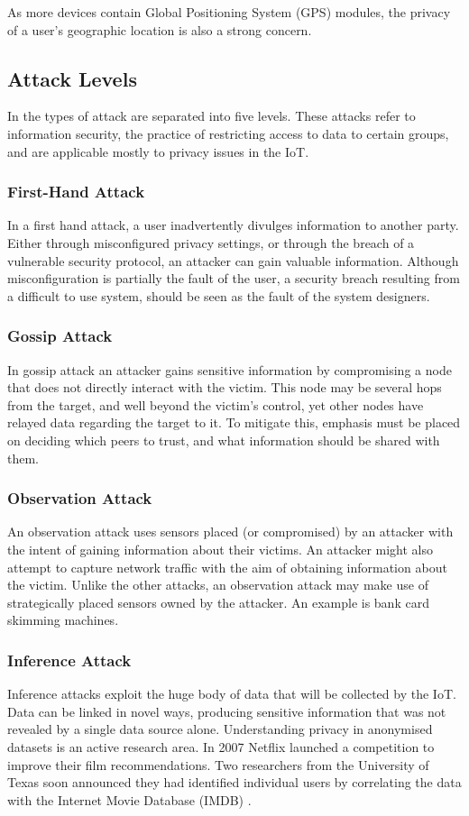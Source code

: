 \documentclass[10pt,journal,compsoc]{IEEEtran}
\begin{document}
As more devices contain Global Positioning System (GPS) modules, the privacy of
a user's geographic location is also a strong concern.

\subsection{Attack Levels}
In \cite{Elkhodr2013} the types of attack are separated into five levels. These
attacks refer to information security, the practice of restricting access to
data to certain groups, and are applicable mostly to privacy issues in the IoT.

\subsubsection{First-Hand Attack}
In a first hand attack, a user inadvertently divulges information to another
party. Either through misconfigured privacy settings, or through the breach of
a vulnerable security protocol, an attacker can gain valuable information.
Although misconfiguration is partially the fault of the user, a security breach
resulting from a difficult to use system, should be seen as the fault of the
system designers. 

\subsubsection{Gossip Attack}
In gossip attack an attacker gains sensitive information by compromising a node
that does not directly interact with the victim. This node may be several hops
from the target, and well beyond the victim's control, yet other nodes have
relayed data regarding the target to it. To mitigate this, emphasis must be
placed on deciding which peers to trust, and what information should be shared
with them.

\subsubsection{Observation Attack}
An observation attack uses sensors placed (or compromised) by an
attacker with the intent of gaining information about their victims. An
attacker might also attempt to capture network traffic with the aim of
obtaining information about the victim. Unlike the other attacks, an
observation attack may make use of strategically placed sensors owned by the
attacker. An example is bank card skimming machines. 

\subsubsection{Inference Attack}
Inference attacks exploit the huge body of data that will be collected by the
IoT. Data can be linked in novel ways, producing sensitive information that was
not revealed by a single data source alone. Understanding privacy in anonymised
datasets is an active research area. In 2007 Netflix launched a competition to
improve their film recommendations. Two researchers from the University of
Texas soon announced they had identified individual users by correlating the
data with the Internet Movie Database (IMDB) \cite{Narayanan2008}.
\end{document}
